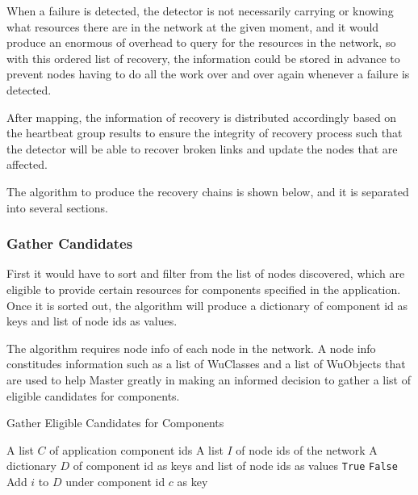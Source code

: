 When a failure is detected, the detector is not necessarily carrying or knowing
what resources there are in the network at the given moment, and it would
produce an enormous of overhead to query for the resources in the network, so
with this ordered list of recovery, the information could be stored in advance
to prevent nodes having to do all the work over and over again whenever
a failure is detected. 

After mapping, the information of recovery is distributed accordingly based on
the heartbeat group results to ensure the integrity of recovery process such
that the detector will be able to recover broken links and update the nodes
that are affected.

The algorithm to produce the recovery chains is shown below, and it is
separated into several sections.

\subsubsection{Gather Candidates}

First it would have to sort and filter from the list of nodes discovered, which
are eligible to provide certain resources for components specified in the
application. Once it is sorted out, the algorithm will produce a dictionary of
component id as keys and list of node ids as values.

The algorithm requires node info of each node in the network. A node info
constitudes information such as a list of WuClasses and a list of WuObjects
that are used to help Master greatly in making an informed decision to gather
a list of eligible candidates for components.

\begin{algorithm}
\caption{Gather Eligible Candidates for Components}
\label{alg:recovery-chain}
\begin{algorithmic}
\Require A list $C$ of application component ids
\Require A list $I$ of node ids of the network
\Ensure A dictionary $D$ of component id as keys and list of node ids as values
    \State \Return \texttt{True}
  \Else
    \State \Return \texttt{False}
  \EndIf
\EndFunction
{}
      \State Add $i$ to $D$ under component id $c$ as key
    \EndIf
  \EndFor
\EndFor
\end{algorithmic}
\end{algorithm}

